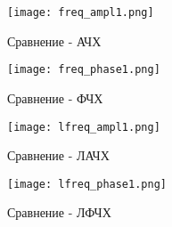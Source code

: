 \newpage
\begin{figure}[ht]
  \centering
  \texttt{[image: freq\_ampl1.png]}
\caption{Сравнение - АЧХ}
\end{figure}

\begin{figure}[ht]
    \centering
    \texttt{[image: freq\_phase1.png]}
  \caption{Сравнение - ФЧХ}
  \end{figure}
\newpage
\begin{figure}[ht]
    \centering
    \texttt{[image: lfreq\_ampl1.png]}
  \caption{Сравнение - ЛАЧХ}
  \end{figure}
  
  \begin{figure}[ht]
      \centering
      \texttt{[image: lfreq\_phase1.png]}
    \caption{Сравнение - ЛФЧХ}
    \end{figure}

\newpage

\endinput